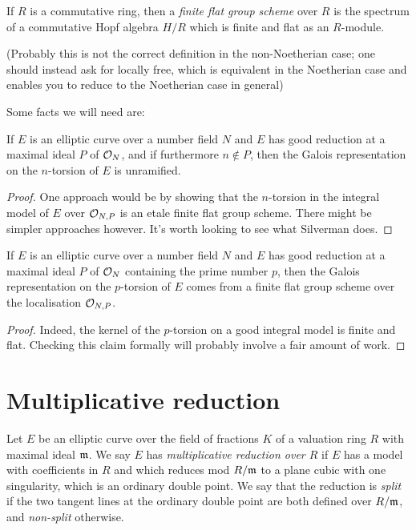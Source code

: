 \begin{definition}\label{finite_flat_group_scheme} If $R$ is a commutative ring, then
  a \emph{finite flat group scheme} over $R$ is the spectrum of a commutative Hopf algebra $H/R$ 
  which is finite and flat as an $R$-module.
\end{definition}

(Probably this is not the correct definition in the non-Noetherian case; one should instead ask for locally free, which is equivalent in the Noetherian case and enables you to reduce to the Noetherian case in general)

Some facts we will need are:

\begin{theorem}\label{good_reduction_implies_unramified} If $E$ is an elliptic curve over a number 
  field $N$ and $E$ has good reduction at a maximal ideal $P$ of $\mathcal{O}_N$, and if furthermore 
  $n\not\in P$, then the Galois representation on the $n$-torsion of $E$ is unramified.
\end{theorem}
\begin{proof}
  One approach would be by showing that the $n$-torsion in the integral model of $E$ over $\mathcal{O}_{N,P}$
  is an etale finite flat group scheme. There might be simpler approaches however. It's worth looking to see what Silverman does.
\end{proof}

\begin{theorem}\label{good_reduction_implies_flat} If $E$ is an elliptic curve over a number field 
  $N$ and $E$ has good reduction at a maximal ideal $P$ of $\mathcal{O}_N$ containing the prime number $p$, 
  then the Galois representation on the $p$-torsion of $E$ comes from a finite flat group scheme 
  over the localisation $\mathcal{O}_{N,P}$.
\end{theorem}
\begin{proof}
  Indeed, the kernel of the $p$-torsion on a good integral model is finite and flat.
  Checking this claim formally will probably involve a fair amount of work.
\end{proof}

\section{Multiplicative reduction}

\begin{definition}\label{EllipticCurve.MultiplicativeReduction} Let $E$ be an elliptic curve over the field of fractions $K$ of a valuation ring $R$ with maximal ideal $\mathfrak{m}$. We say $E$ has \emph{multiplicative reduction over $R$} if $E$ has a model with coefficients in $R$ and which reduces mod $R/\mathfrak{m}$ to a plane cubic with one singularity, which is an ordinary double point.
  We say that the reduction is \emph{split} if the two tangent lines at the ordinary double point
  are both defined over $R/\mathfrak{m}$, and \emph{non-split} otherwise.
\end{definition}


